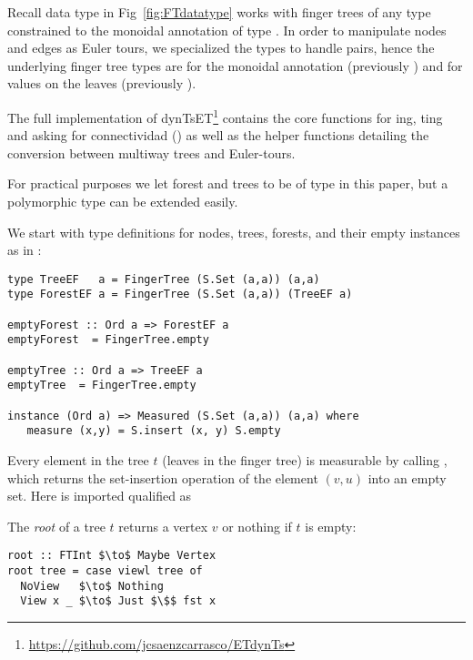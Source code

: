 Recall data type in Fig~\ref{fig:FTdatatype} works with finger trees of any type  constrained to the monoidal annotation of type . In order to manipulate nodes and edges as Euler tours, we specialized the \dyntset types to handle  pairs, hence the underlying finger tree types are  for the monoidal annotation (previously ) and  for values on the leaves (previously ). 

The full implementation of dynTsET\footnote{\url{https://github.com/jcsaenzcarrasco/ETdynTs}} contains the core functions for ing, ting and asking for connectividad () as well as the helper functions detailing the conversion between multiway trees and Euler-tours.


For practical purposes we let forest and trees to be of type  in this paper, but a polymorphic type can be extended easily.

We start with type definitions for nodes, trees, forests, and their empty instances as in : %
\begin{lstlisting}[mathescape]
type TreeEF   a = FingerTree (S.Set (a,a)) (a,a)
type ForestEF a = FingerTree (S.Set (a,a)) (TreeEF a) 

emptyForest :: Ord a => ForestEF a  
emptyForest  = FingerTree.empty 

emptyTree :: Ord a => TreeEF a 
emptyTree  = FingerTree.empty 

instance (Ord a) => Measured (S.Set (a,a)) (a,a) where 
   measure (x,y) = S.insert (x, y) S.empty 
\end{lstlisting}   

Every element in the tree $t$ (leaves in the finger tree) is measurable by calling , which returns the set-insertion operation of the element $(v,u)$ into an empty set. Here  is imported qualified as 

The \textit{root} of a tree $t$ returns a vertex $v$ or nothing if $t$ is empty:
\begin{lstlisting}[mathescape]
root :: FTInt $\to$ Maybe Vertex  
root tree = case viewl tree of
  NoView   $\to$ Nothing
  View x _ $\to$ Just $\$$ fst x
\end{lstlisting}

